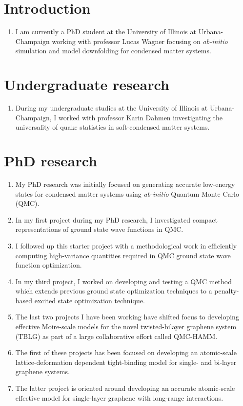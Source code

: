 \documentclass{article}
\begin{document}
\section{Introduction}
\begin{enumerate}
\item I am currently a PhD student at the University of Illinois at Urbana-Champaign working with professor Lucas Wagner focusing on \textit{ab-initio} simulation and model downfolding for condensed matter systems.
\end{enumerate}

\section{Undergraduate research}
\begin{enumerate}
\item During my undergraduate studies at the University of Illinois at Urbana-Champaign, I worked with professor Karin Dahmen investigating the universality of quake statistics in soft-condensed matter systems.
\end{enumerate}

\section{PhD research}
\begin{enumerate}
\item My PhD research was initially focused on generating accurate low-energy states for condensed matter systems  using \textit{ab-initio} Quantum Monte Carlo (QMC).

\item In my first project during my PhD research, I investigated compact representations of ground state wave functions in QMC.

\item I followed up this starter project with a methodological work in efficiently computing high-variance quantities required in QMC ground state wave function optimization.

\item In my third project, I worked on developing and testing a QMC method which extends previous ground state optimization techniques to a penalty-based excited state optimization technique.

\item The last two projects I have been working have shifted focus to developing effective  Moire-scale models for the novel twisted-bilayer graphene system (TBLG) as part of a large collaborative effort called QMC-HAMM. 

\item The first of these projects has been focused on developing an atomic-scale lattice-deformation dependent tight-binding model for single- and bi-layer graphene systems.

\item The latter project is oriented around developing an accurate atomic-scale effective model for single-layer graphene with long-range interactions.
\end{enumerate}
\end{document}
